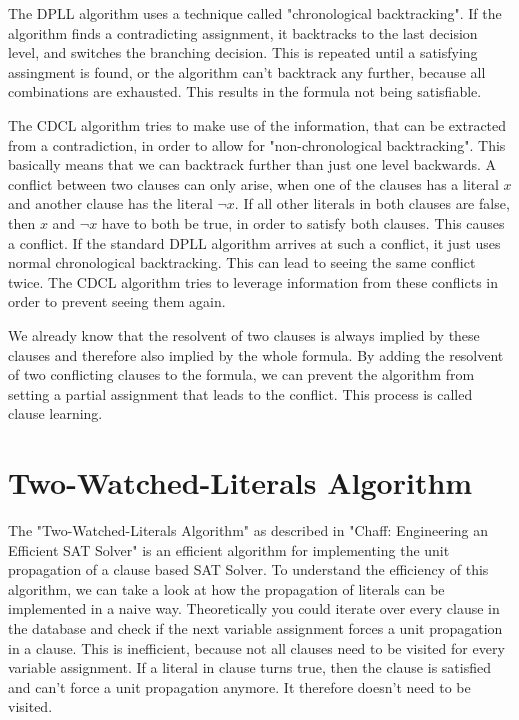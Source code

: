 The DPLL algorithm uses a technique called "chronological backtracking". If the algorithm finds a contradicting assignment, it backtracks to the last decision level, and switches the branching decision. This is repeated until a satisfying assingment is found, or the algorithm can't backtrack any further, because all combinations are exhausted. This results in the formula not being satisfiable. \cite{biere2009handbook}

The CDCL algorithm tries to make use of the information, that can be extracted from a contradiction, in order to allow for "non-chronological backtracking". This basically means that we can backtrack further than just one level backwards. \cite{biere2009handbook}
A conflict between two clauses can only arise, when one of the clauses has a literal $x$ and another clause has the literal $\neg x$. If all other literals in both clauses are false, then $x$ and $\neg x$ have to both be true, in order to satisfy both clauses. This causes a conflict.
If the standard DPLL algorithm arrives at such a conflict, it just uses normal chronological backtracking. This can lead to seeing the same conflict twice. The CDCL algorithm tries to leverage information from these conflicts in order to prevent seeing them again.

We already know that the resolvent of two clauses is always implied by these clauses and therefore also implied by the whole formula. By adding the resolvent of two conflicting clauses to the formula, we can prevent the algorithm from setting a partial assignment that leads to the conflict. This process is called clause learning. \cite{biere2009handbook}

\section{Two-Watched-Literals Algorithm}
\label{sec:twoWatchedLiterals}

The "Two-Watched-Literals Algorithm" as described in "Chaff: Engineering an Efficient SAT Solver" \cite{moskewicz2001chaff} is an efficient algorithm for implementing the unit propagation of a clause based SAT Solver. To understand the efficiency of this algorithm, we can take a look at how the propagation of literals can be implemented in a naive way. Theoretically you could iterate over every clause in the database and check if the next variable assignment forces a unit propagation in a clause. This is inefficient, because not all clauses need to be visited for every variable assignment. If a literal in clause turns true, then the clause is satisfied and can't force a unit propagation anymore. It therefore doesn't need to be visited.

